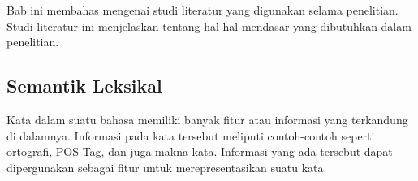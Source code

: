 \chapter{\babDua}
Bab ini membahas mengenai studi literatur yang digunakan selama penelitian. Studi literatur ini menjelaskan tentang hal-hal mendasar yang dibutuhkan dalam penelitian.

\section{Semantik Leksikal}

Kata dalam suatu bahasa memiliki banyak fitur atau informasi yang terkandung di dalamnya. Informasi pada kata tersebut meliputi contoh-contoh seperti ortografi, POS Tag, dan juga makna kata. Informasi yang ada tersebut dapat dipergunakan sebagai fitur untuk merepresentasikan suatu kata.

